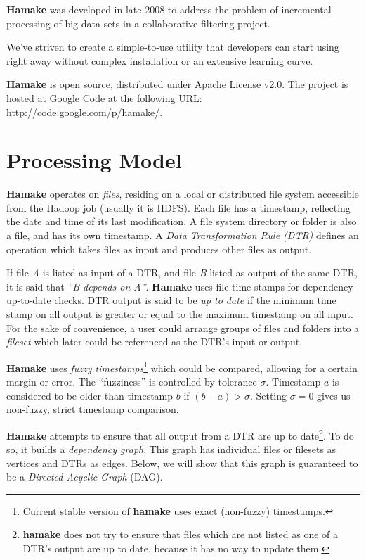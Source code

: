\documentclass[10pt,conference,letterpaper]{IEEEtran}
\begin{document}
\textbf{Hamake} was developed in late 2008 to address the problem of
incremental processing of big data sets in a collaborative filtering
project.

We've striven to create a simple-to-use utility that developers can
start using right away without complex installation or an extensive
learning curve. 

\textbf{Hamake} is open source, distributed under Apache
License v2.0. The project is hosted at Google Code at the following
URL: \url{http://code.google.com/p/hamake/}.

\section{Processing Model}

\textbf{Hamake} operates on \textit{files}, residing on a local or
distributed file system accessible from the Hadoop job (usually it is
HDFS). Each file has a timestamp, reflecting the date and time of its
last modification. A file system directory or folder is also a file,
and has its own timestamp. A \textit{Data Transformation Rule (DTR)}
defines an operation which takes files as input and produces other
files as output.

If file \textit{A} is listed as input of a DTR, and file \textit{B}
listed as output of the same DTR, it is said that \textit{``B depends
  on A''}. \textbf{Hamake} uses file time stamps for dependency
up-to-date checks. DTR output is said to be \textit{up to date} if the
minimum time stamp on all output is greater or equal to the maximum
timestamp on all input. For the sake of convenience, a user could
arrange groups of files and folders into a \emph{fileset} which later
could be referenced as the DTR's input or output.

\textbf{Hamake} uses \textit{fuzzy timestamps}\footnote{Current stable
  version of \textbf{hamake} uses exact (non-fuzzy) timestamps.}
which could be compared, allowing for a certain margin or error. The
``fuzziness'' is controlled by tolerance $\sigma$. Timestamp $a$ is
considered to be older than timestamp $b$ if $(b-a)>\sigma$. Setting
$\sigma=0$ gives us non-fuzzy, strict timestamp comparison.

\textbf{Hamake} attempts to ensure that all output from a DTR are up to
date\footnote{\textbf{hamake} does not try to ensure that files which
  are not listed as one of a DTR's output are up to date, because it has
  no way to update them.}.  To do so, it builds a \textit{dependency
  graph}. This graph has individual files or filesets as vertices and
DTRs as edges. Below, we will show that this graph is guaranteed to be
a \textit{Directed Acyclic Graph} (DAG).
\end{document}
